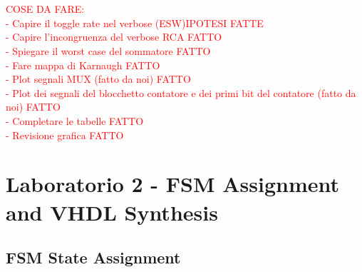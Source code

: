 \documentclass[11pt,  english, makeidx, a4paper, titlepage, oneside]{book}
\begin{document}
\\\\
\textcolor{red}{COSE DA FARE: \\
                 - Capire il toggle rate nel verbose (ESW)IPOTESI FATTE  \\
                 - Capire l'incongruenza del verbose RCA FATTO \\
                 - Spiegare il worst case del sommatore FATTO \\
                 - Fare mappa di Karnaugh FATTO \\
                 - Plot segnali MUX (fatto da noi) FATTO \\
                 - Plot dei segnali del blocchetto contatore e dei primi bit del contatore (fatto da noi) FATTO\\
                 - Completare le tabelle FATTO\\
                - Revisione grafica FATTO }  
\newpage
\chapter{Laboratorio 2 - FSM Assignment and VHDL Synthesis}    
\section{FSM State Assignment}
\end{document}
